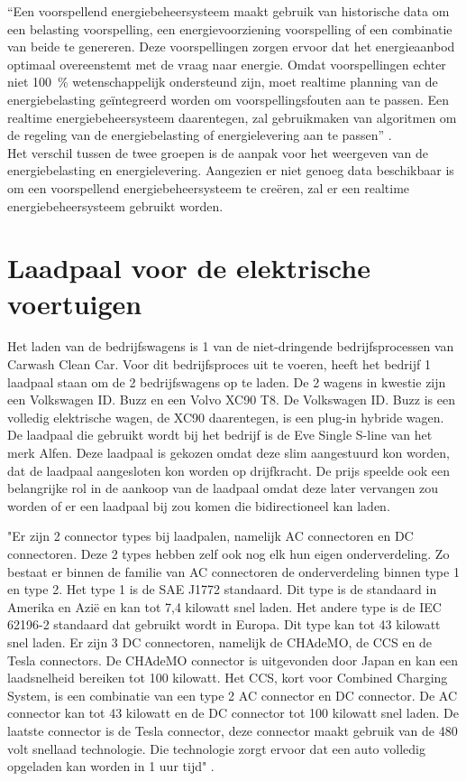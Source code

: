 “Een voorspellend energiebeheersysteem maakt gebruik van historische data om een belasting voorspelling, een energievoorziening voorspelling of een combinatie van beide te genereren. Deze voorspellingen zorgen ervoor dat het energieaanbod optimaal overeenstemt met de vraag naar energie. Omdat voorspellingen echter niet 100~\% wetenschappelijk ondersteund zijn, moet realtime planning van de energiebelasting geïntegreerd worden om voorspellingsfouten aan te passen. Een realtime energiebeheersysteem daarentegen, zal gebruikmaken van algoritmen om de regeling van de energiebelasting of energielevering aan te passen” \autocite{FALOPE2024}.\\

Het verschil tussen de twee groepen is de aanpak voor het weergeven van de energiebelasting en energielevering. Aangezien er niet genoeg data beschikbaar is om een voorspellend energiebeheersysteem te creëren, zal er een realtime energiebeheersysteem gebruikt worden.

\section{Laadpaal voor de elektrische voertuigen}
\label{sec:stand-van-zaken-laadpaal}

Het laden van de bedrijfswagens is 1 van de niet-dringende bedrijfsprocessen van Carwash Clean Car. Voor dit bedrijfsproces uit te voeren, heeft het bedrijf 1 laadpaal staan om de 2 bedrijfswagens op te laden. De 2 wagens in kwestie zijn een Volkswagen ID. Buzz en een Volvo XC90 T8. De Volkswagen ID. Buzz is een volledig elektrische wagen, de XC90 daarentegen, is een plug-in hybride wagen. De laadpaal die gebruikt wordt bij het bedrijf is de Eve Single S-line van het merk Alfen. Deze laadpaal is gekozen omdat deze slim aangestuurd kon worden, dat de laadpaal aangesloten kon worden op drijfkracht. De prijs speelde ook een belangrijke rol in de aankoop van de laadpaal omdat deze later vervangen zou worden of er een laadpaal bij zou komen die bidirectioneel kan laden.

"Er zijn 2 connector types bij laadpalen, namelijk AC connectoren en DC connectoren. Deze 2 types hebben zelf ook nog elk hun eigen onderverdeling. Zo bestaat er binnen de familie van AC connectoren de onderverdeling binnen type 1 en type 2. Het type 1 is de SAE J1772 standaard. Dit type is de standaard in Amerika en Azië en kan tot 7,4 kilowatt snel laden. Het andere type is de IEC 62196-2 standaard dat gebruikt wordt in Europa. Dit type kan tot 43 kilowatt snel laden. Er zijn 3 DC connectoren, namelijk de CHAdeMO, de CCS en de Tesla connectors. De CHAdeMO connector is uitgevonden door Japan en kan een laadsnelheid bereiken tot 100 kilowatt. Het CCS, kort voor Combined Charging System, is een combinatie van een type 2 AC connector en DC connector. De AC connector kan tot 43 kilowatt en de DC connector tot 100 kilowatt snel laden. De laatste connector is de Tesla connector, deze connector maakt gebruik van de 480 volt snellaad technologie. Die technologie zorgt ervoor dat een auto volledig opgeladen kan worden in 1 uur tijd" \autocite{HEMAVATHI2022}. \\

